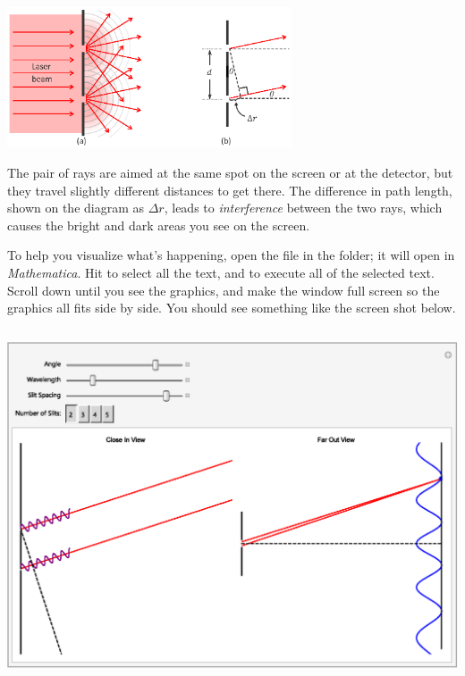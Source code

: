 {\centering \includegraphics[width=0.63\textwidth]{interference_of_light/rays2_color.eps} \par}

The pair of rays are aimed at the same spot on the screen or at the detector, 
but they travel slightly different distances to get there.  
The difference in path length, shown on the diagram as $\Delta r$, leads to \textit{interference} between the two rays, which causes the 
bright and dark areas you see on the screen.

To help you visualize what's happening, open the file  in the \filename{\coursefolder} folder; 
it will open in \textit{Mathematica}.  Hit  to select all the text, and  
to execute all of the selected text.  Scroll down until you see the graphics, and make the window full screen so the graphics all fits side by side.  You should see something like the screen shot below.

{\centering \includegraphics[height=4.1in]{interference_of_light/screengrab.eps} \par}

